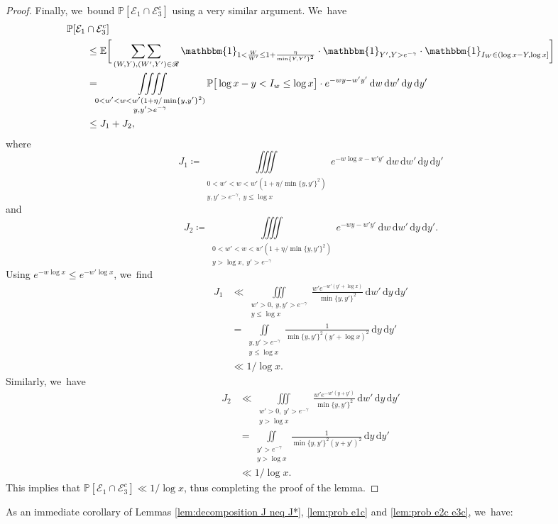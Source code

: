 \documentclass[10pt,a4paper]{amsart}
\newcommand{\PP}{\mathbb{P}}
\newcommand{\EE}{\mathbb{E}}
\newcommand{\dee}{\,\mathrm{d}}
\newcommand{\one}{\mathbbm{1}}
\newcommand{\EC}{\mathcal{E}}
\newcommand{\RS}{\mathscr{R}}
\newcommand{\bg}{\big}
\newcommand{\bggg}{\bigg}
\theoremstyle{plain}
\theoremstyle{definition}
\begin{document}
\begin{proof}
Finally, we~bound $\PP[\EC_1 \cap \EC_3^c]$ using a very similar argument. We~have
\[
\begin{split}
&\PP[\EC_1 \cap \EC_3^c] \\
&\qquad \le
\EE\bggg[ \mathop{\sum\sum}_{(W,Y),(W',Y') \in\RS} \one_{1<\frac{W}{W'}\le 1+\frac{\eta}{\min\{Y,Y'\}^2}}\cdot\one_{Y',Y>e^{-\gamma}} \cdot \one_{I_W\in(\log x-Y,\log x]} \bggg] \\
&\qquad =
\iiiint\limits_{\substack{0 < w'<w < w'(1+\eta/\min\{y,y'\}^2)\\ y, y' > e^{-\gamma}}} \PP\bg[\log x - y<I_w \le \log x\bg]\cdot e^{-wy-w'y'}
\dee w\dee w'\dee y\dee y' \\
&\qquad \le J_1+J_2,
\end{split}
\]
where
\[
J_1 \coloneqq \iiiint\limits_{\substack{0 < w'<w < w'(1+\eta/\min\{y,y'\}^2)\\ y, y' > e^{-\gamma},\ y\le \log x}} e^{-w\log x-w'y'}
\dee w\dee w'\dee y\dee y'
\]
and
\[
J_2 \coloneqq \iiiint\limits_{\substack{0 < w'<w < w'(1+\eta/\min\{y,y'\}^2)\\ y>\log x,\ y' > e^{-\gamma}}} e^{-wy-w'y'}
\dee w\dee w'\dee y\dee y'.
\]
Using $e^{-w\log x}\le e^{-w'\log x}$, we~find
\begin{align*}
J_1&\ll \iiint\limits_{\substack{w'>0,\ y, y' > e^{-\gamma}\\ y\le \log x}} \frac{w'e^{-w'(y'+\log x)}}{\min\{y,y'\}^2} \dee w'\dee y\dee y' \\
&= \iint\limits_{\substack{y, y' > e^{-\gamma} \\ y\le \log x}} \frac{1}{\min\{y,y'\}^2(y'+\log x)^2} \dee y\dee y'\\
& \ll1/\log x.
\end{align*}
Similarly, we~have
\begin{align*}
J_2&\ll \iiint\limits_{\substack{w'>0,\ y' > e^{-\gamma}\\ y>\log x}} \frac{w'e^{-w'(y+y')} }{\min\{y,y'\}^2} \dee w'\dee y\dee y' \\
&= \iint\limits_{\substack{y' > e^{-\gamma} \\ y>\log x}} \frac{1}{\min\{y,y'\}^2(y+y')^2} \dee y\dee y'\\
& \ll1/\log x.
\end{align*}
This implies that $\PP[\EC_1\cap\EC_3^c]\ll 1/\log x$, thus completing the proof of the lemma.
\end{proof}

As an immediate corollary of Lemmas \ref{lem:decomposition J neq J*}, \ref{lem:prob e1c} and \ref{lem:prob e2c e3c}, we~have:
\end{document}
